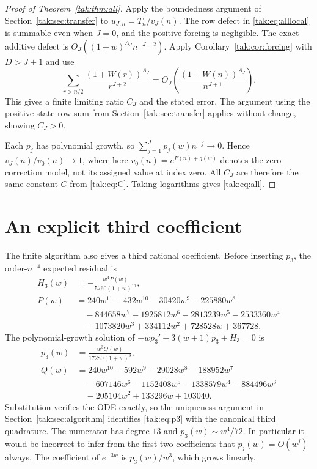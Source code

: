 \documentclass[11pt,letterpaper]{article}
\theoremstyle{remark}\newtheorem{remark}[theorem]{Remark}
\begin{document}
\begin{proof}[Proof of Theorem~\ref{tak:thm:all}]
Apply the boundedness argument of Section~\ref{tak:sec:transfer} to $u_{J,n}=T_n/v_J(n)$. The row defect in \eqref{tak:eq:alllocal} is summable even when $J=0$, and the positive forcing is negligible. The exact additive defect is
$O_J((1+w)^{A_J}n^{-J-2})$. Apply Corollary~\ref{tak:cor:forcing} with $D>J+1$ and use
\[
 \sum_{r>n/2}\frac{(1+W(r))^{A_J}}{r^{J+2}}
     =O_J\!\left(\frac{(1+W(n))^{A_J}}{n^{J+1}}\right).
\]
This gives a finite limiting ratio $C_J$ and the stated error. The argument using the positive-state row sum from Section~\ref{tak:sec:transfer} applies without change, showing $C_J>0$.

Each $p_j$ has polynomial growth, so $\sum_{j=1}^Jp_j(w)n^{-j}\to0$. Hence $v_J(n)/v_0(n)\to1$, where here $v_0(n)=e^{F(n)+g(w)}$ denotes the zero-correction model, not its assigned value at index zero. All $C_J$ are therefore the same constant $C$ from \eqref{tak:eq:C}. Taking logarithms gives \eqref{tak:eq:all}.
\end{proof}

\section{An explicit third coefficient}\label{tak:sec:p3}
The finite algorithm also gives a third rational coefficient. Before inserting $p_3$, the order-$n^{-4}$ expected residual is
\begin{align}
 H_3(w)&=-\frac{w^4 P(w)}{5760(1+w)^{10}},\label{tak:eq:H3}\\
 P(w)&=240w^{11}-432w^{10}-30420w^9-225880w^8\nonumber\\
 &\quad-844658w^7-1925812w^6-2813239w^5-2533360w^4\nonumber\\
 &\quad-1073820w^3+334112w^2+728528w+367728.\nonumber
\end{align}
The polynomial-growth solution of $-wp_3'+3(w+1)p_3+H_3=0$ is
\begin{align}
 p_3(w)&=\frac{w^3 Q(w)}{17280(1+w)^9},\label{tak:eq:p3}\\
 Q(w)&=240w^{10}-592w^9-29028w^8-188952w^7\nonumber\\
 &\quad-607146w^6-1152408w^5-1338579w^4-884496w^3\nonumber\\
 &\quad-205104w^2+133296w+103040.\nonumber
\end{align}
Substitution verifies the ODE exactly, so the uniqueness argument in Section~\ref{tak:sec:algorithm} identifies \eqref{tak:eq:p3} with the canonical third quadrature. The numerator has degree $13$ and $p_3(w)\sim w^4/72$. In particular it would be incorrect to infer from the first two coefficients that $p_j(w)=O(w^j)$ always. The coefficient of $e^{-3w}$ is $p_3(w)/w^3$, which grows linearly.
\end{document}
